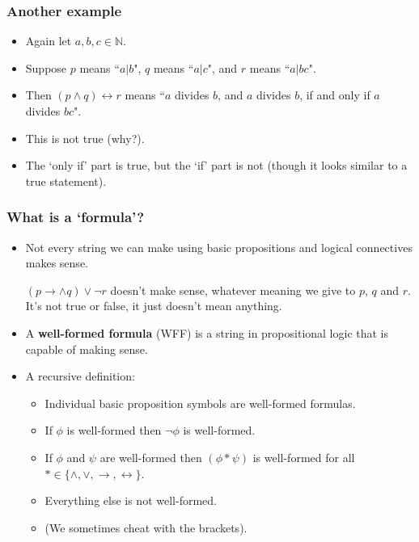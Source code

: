 \documentclass[handout]{beamer}
\newcommand{\bN}{\mathbb{N}}
\begin{document}
\begin{frame}
\frametitle{Another example}
\begin{example}
\begin{itemize}
\item Again let $a,b,c\in \bN$.
\vspace{0.2cm} 
\item Suppose $p$ means ``$a|b$", $q$ means ``$a|c$", and $r$ means ``$a|bc$". 
\vspace{0.2cm}
\item Then $(p\wedge q)\leftrightarrow r$ means ``$a$ divides $b$, and $a$ divides $b$, if and only if $a$ divides $bc$". 
\vspace{0.2cm}
\item This is not true (why?). 
\vspace{0.2cm}
\item The `only if' part is true, but the `if' part is not (though it looks similar to a true statement).
\end{itemize} 
\end{example}
\end{frame}

\begin{frame}
\frametitle{What is a `formula'?}
\begin{itemize}
\item Not every string we can make using basic propositions and logical connectives makes sense.
\begin{example}
$(p\rightarrow \wedge q)\vee \neg r$ doesn't make sense, whatever meaning we give to $p$, $q$ and $r$. It's not true or false, it just doesn't mean anything.
\end{example}
\vspace{0.2cm}
\item A \textbf{well-formed formula} (WFF)  is a string in propositional logic that is capable of making sense.
\vspace{0.2cm}
\item A recursive definition:
\begin{itemize}
\item Individual basic proposition symbols are well-formed formulas.
\item If $\phi$ is well-formed then $\neg \phi$ is well-formed.
\item If $\phi$ and $\psi$ are well-formed then $(\phi * \psi)$ is well-formed for all $*\in\{\wedge, \vee, \rightarrow,\leftrightarrow\}$.
\item Everything else is not well-formed.
\item (We sometimes cheat with the brackets).
\end{itemize}
\end{itemize}
\end{frame}
\end{document}
